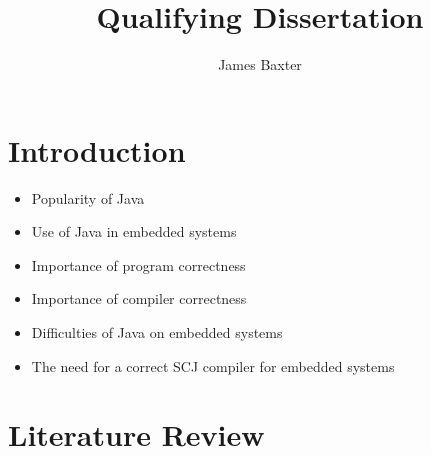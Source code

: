 \documentclass[a4paper,12pt]{article}
\title{Qualifying Dissertation}
\author{James Baxter}
\date{}
\begin{document}
\maketitle

\section{Introduction}
\begin{itemize}
  \item Popularity of Java
  \item Use of Java in embedded systems
  \item Importance of program correctness
  \item Importance of compiler correctness
  \item Difficulties of Java on embedded systems
  \item The need for a correct SCJ compiler for embedded systems
\end{itemize}

\section{Literature Review}
\end{document}
